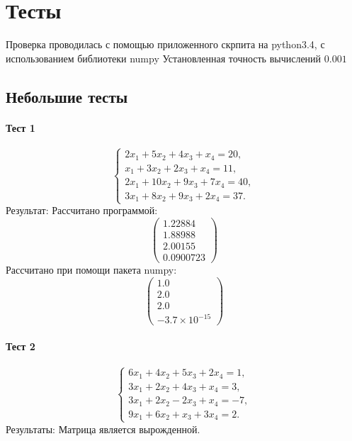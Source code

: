 \newpage
\section{Тесты}
Проверка проводилась с помощью приложенного скрпита на python3.4, с использованием библиотеки numpy
Установленная точность вычислений $0.001$
\subsection{Небольшие тесты}
\paragraph{Тест 1}
\begin{equation*}
    \begin{cases}
    2x_1 + 5x_2 + 4x_3 + x_4 = 20, \\
    x_1 + 3x_2 + 2x_3 + x_4 = 11, \\
    2x_1 + 10x_2 + 9x_3 + 7x_4 = 40, \\
    3x_1 + 8x_2 + 9x_3 + 2x_4 = 37.
    \end{cases}
\end{equation*}
Результат:
Рассчитано программой:
\begin{equation*}
    \begin{pmatrix}
        1.22884 \\
        1.88988 \\
        2.00155 \\
        0.0900723
    \end{pmatrix}
\end{equation*}
Рассчитано при помощи пакета numpy:
\begin{equation*}
    \begin{pmatrix}
        1.0 \\
        2.0 \\
        2.0 \\
        -3.7 \times 10^{-15}
    \end{pmatrix}
\end{equation*}

\paragraph{Тест 2}
\begin{equation*}
    \begin{cases}
    6x_1 + 4x_2 + 5x_3 + 2x_4 = 1, \\
    3x_1 + 2x_2 + 4x_3 + x_4 = 3, \\
    3x_1 + 2x_2 - 2x_3 + x_4 = -7, \\
    9x_1 + 6x_2 + x_3 + 3x_4 = 2.
    \end{cases}
\end{equation*}
Результаты:
Матрица является вырожденной.

